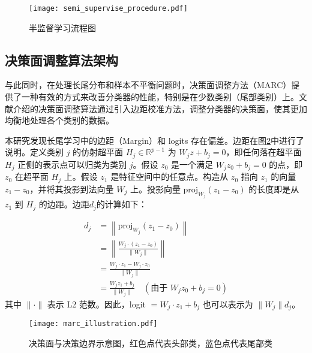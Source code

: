 \documentclass[master]{thesis-uestc}
\begin{document}
\begin{figure}[h]
    \centering
    \texttt{[image: semi\_supervise\_procedure.pdf]}
    \caption{半监督学习流程图}
    \label{semi_supervise_procedure}
\end{figure}

\subsection{决策面调整算法架构}
与此同时，在处理长尾分布和样本不平衡问题时，决策面调整方法（MARC）提供了一种有效的方式来改善分类器的性能，特别是在少数类别（尾部类别）上。文献\cite{wang2023margin}介绍的决策面调整算法通过引入边距校准方法，调整分类器的决策面，使其更加均衡地处理各个类别的数据。

本研究发现长尾学习中的边距（Margin）和 logits 存在偏差。边距在图\ref{marc_illustration}中进行了说明。定义类别 $ j $ 的仿射超平面 $ H_j \in \mathbb{R}^{p-1} $ 为 $ W_j z + b_j = 0 $，即任何落在超平面 $ H_j $ 正侧的表示点可以归类为类别 $ j $。假设 $ z_0 $ 是一个满足 $ W_j z_0 + b_j = 0 $ 的点，即 $ z_0 $ 在超平面 $ H_j $ 上。假设 $ z_1 $ 是特征空间中的任意点。构造从 $ z_0 $ 指向 $ z_1 $ 的向量 $ z_1 - z_0 $，并将其投影到法向量 $ W_j $ 上。投影向量 $ \text{proj}_{W_j}(z_1 - z_0) $ 的长度即是从 $ z_1 $ 到 $ H_j $ 的边距。边距$d_j$的计算如下：

\begin{equation}
    \begin{split}
        d_j &= \left\| \text{proj}_{W_j}(z_1 - z_0) \right\| \\
            &= \left\| \frac{W_j \cdot (z_1 - z_0)}{\|W_j\|} \right\| \\
            &= \frac{W_j \cdot z_1 - W_j \cdot z_0}{\|W_j\|} \\
            &= \frac{W_j z_1 + b_j}{\|W_j\|} \quad (\text{由于 } W_j z_0 + b_j = 0)
    \end{split}
\end{equation}
其中 $ \| \cdot \| $ 表示 L2 范数。因此，logit $= W_j \cdot z_1 + b_j $ 也可以表示为 $ \|W_j\| d_j $。
\begin{figure}[h]
    \centering
    \texttt{[image: marc\_illustration.pdf]}
    \caption{决策面与决策边界示意图，红色点代表头部类，蓝色点代表尾部类}
    \label{marc_illustration}
\end{figure}
\end{document}
